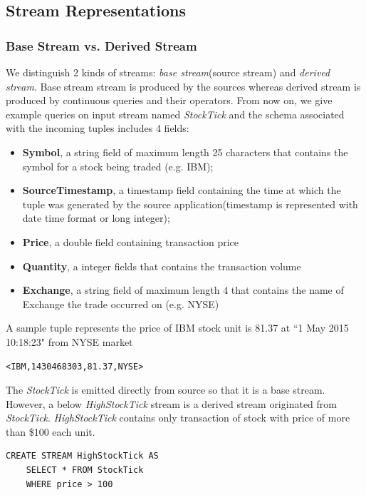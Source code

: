 \subsection*{Stream Representations}
\subsubsection*{Base Stream vs. Derived Stream}
We distinguish 2 kinds of streams: \textit{base stream}(source stream) and \textit{derived stream}. Base stream stream is produced by the sources whereas derived stream is produced by continuous queries and their operators\citep{Arasu:2006}. 
From now on, we give example queries on input stream named \textit{StockTick}\citep{StreamBaseTut} and the schema associated with the incoming tuples includes 4 fields:
\begin{itemize}
\item \textbf{Symbol}, a string field of maximum length 25 characters that contains the symbol for a stock being traded (e.g. IBM);
\item \textbf{SourceTimestamp}, a timestamp field containing the time at which the tuple was generated by the source application(timestamp is represented with date time format or long integer);
\item \textbf{Price}, a double field containing transaction price
\item \textbf{Quantity}, a integer fields that contains the transaction volume
\item \textbf{Exchange}, a string field of maximum length 4 that contains the name of Exchange the trade occurred on (e.g. NYSE)

\end{itemize}
A sample tuple represents the price of IBM stock unit is 81.37 at ``1 May 2015 10:18:23" from NYSE market 
\begin{verbatim}
<IBM,1430468303,81.37,NYSE>
\end{verbatim}

The \textit{StockTick} is emitted directly from source so that it is a base stream. However, a below \textit{HighStockTick} stream is a derived stream originated from \textit{StockTick}. \textit{HighStockTick} contains only transaction of stock with price of more than \$100 each unit.

\begin{verbatim}
CREATE STREAM HighStockTick AS
	SELECT * FROM StockTick 
	WHERE price > 100
\end{verbatim}

